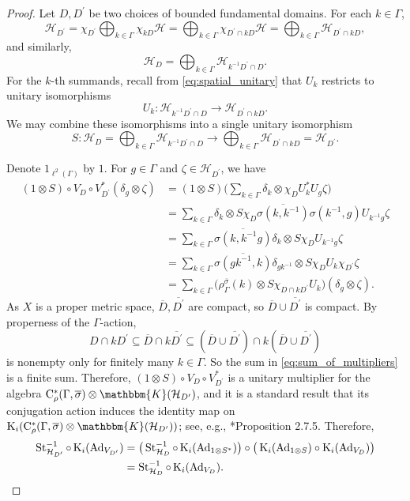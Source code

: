 \documentclass{amsart}
\numberwithin{figure}{section}
\numberwithin{equation}{section}
\numberwithin{table}{section}
\theoremstyle{plain}
\theoremstyle{definition}
\theoremstyle{remark}
\theoremstyle{nonumber}
\newcommand{\Cpt}{\mathbb{K}}
\newcommand{\K}{\relax\ifmmode\operatorname{K}\else\textup{K}\fi}
\newcommand{\Cst}{\relax\ifmmode\mathrm{C}^*\else\textup{C*}\fi}
\newcommand{\Cstr}{\Cst_\rho} %
\newcommand{\Stab}{\operatorname{St}} %
\newcommand{\Ad}{\operatorname{Ad}} %
\renewcommand{\mathbb}{\mathbbm} %
\begin{document}
\begin{proof}
Let $D,D^\prime$ be two choices of bounded fundamental domains. 
For each $k\in \Gamma$,
\[
\mathcal{H}_{D^\prime}=\chi_{D^\prime}\bigoplus_{k\in \Gamma}\chi_{kD}\mathcal{H}=\bigoplus_{k\in \Gamma}\chi_{D^\prime\cap kD}\mathcal{H}=\bigoplus_{k\in \Gamma}\mathcal{H}_{D^\prime\cap kD},
\]
and similarly,
\[
\mathcal{H}_D=\bigoplus_{k\in \Gamma}\mathcal{H}_{k^{-1}D^\prime\cap D}.
\]
For the $k$-th summands, recall from \eqref{eq:spatial_unitary} that $U_k$ restricts to unitary isomorphisms
\[
U_k\colon \mathcal{H}_{k^{-1} D^\prime\cap D}\to \mathcal{H}_{D^\prime \cap kD}.
\]
We may combine these isomorphisms into a single unitary isomorphism
\[
S\colon \mathcal{H}_{D}=\bigoplus_{k\in \Gamma}\mathcal{H}_{k^{-1}D^\prime \cap D}\to \bigoplus_{k\in \Gamma}\mathcal{H}_{D^\prime \cap kD}=\mathcal{H}_{D^\prime}.
\]

Denote $1_{\ell^2(\Gamma)}$ by $1$. For $g\in \Gamma$ and $\zeta\in \mathcal{H}_{D^\prime}$, we have
\begin{equation}
\label{eq:sum_of_multipliers}
\begin{aligned}
(1\otimes S)\circ V_{D}\circ V_{D^\prime}^*(\delta_g\otimes \zeta)
&=(1\otimes S)\Big(\sum_{k\in \Gamma}\delta_k\otimes \chi_DU_k^*U_g\zeta\Big)\\
&=\sum_{k\in\Gamma}\delta_k\otimes S\chi_D\overline{\sigma(k,k^{-1})}\sigma(k^{-1},g)U_{k^{-1}g}\zeta\\
&=\sum_{k\in\Gamma}\overline{\sigma(k,k^{-1}g)}\delta_k\otimes S\chi_D U_{k^{-1}g}\zeta\\
&=\sum_{k\in\Gamma}\overline{\sigma(gk^{-1},k)}\delta_{gk^{-1}}\otimes S\chi_D U_k\chi_{D^\prime}\zeta\\
&=\sum_{k\in\Gamma}\big(\rho_\Gamma^{\overline{\sigma}}(k)\otimes S\chi_{D\cap kD^\prime}U_k\big)(\delta_g\otimes\zeta).
\end{aligned}
\end{equation}
As $X$ is a proper metric space, $\overline{D}, \overline{D^\prime}$ are
compact, so $\overline{D}\cup\overline{D^\prime}$ is compact. By properness
of the $\Gamma$-action,
\[
D\cap kD^\prime\subseteq \overline{D}\cap k\overline{D^\prime}\subseteq (\overline{D}\cup\overline{D^\prime})\cap k(\overline{D}\cup\overline{D^\prime})
\]
is nonempty only for finitely many $k\in\Gamma$. So the sum in
\eqref{eq:sum_of_multipliers} is a finite sum. Therefore, $(1\otimes
S)\circ V_{D}\circ V_{D^\prime}^*$ is a unitary multiplier for the algebra
\mbox{$\Cstr(\Gamma,\overline{\sigma})\otimes\Cpt(\mathcal{H}_{D^\prime})$},
and it is a standard result that its conjugation action induces the
identity map on
$\K_i(\Cstr(\Gamma,\overline{\sigma})\otimes\Cpt(\mathcal{H}_{D^\prime}))$;
see, e.g., \cite{Willett-Yu:Higher_index_theory}*{Proposition 2.7.5}.
Therefore,
\begin{align*}
\Stab_{\mathcal{H}_{D^\prime}}^{-1}\circ\K_i(\Ad_{V_{D^\prime}})&=\big(\Stab_{\mathcal{H}_D}^{-1}\circ\K_i(\Ad_{1\otimes S^*})\big)\circ\big(\K_i(\Ad_{1\otimes S})\circ \K_i(\Ad_{V_{D}})\big)\\
&=\Stab_{\mathcal{H}_D}^{-1}\circ \K_i(\Ad_{V_{D}}).\qedhere
\end{align*}
\end{proof}
\end{document}
